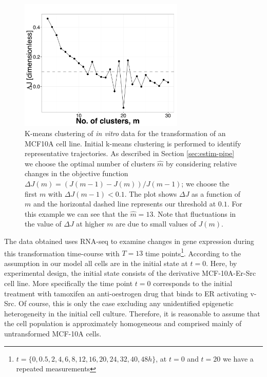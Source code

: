 \begin{figure}
  \centering
  \includegraphics[width=0.7\textwidth]{pics/kmeans-dat.pdf}
  \caption{K-means clustering of {\it in vitro} data for the transformation of an MCF10A cell line. Initial k-means clustering is performed to identify representative trajectories. As described in Section \ref{sec:estim-pipe} we choose the optimal number of clusters $\hat{m}$ by considering relative changes in the objective function $\Delta J (m) = (J(m-1) - J(m))/J(m-1)$; we choose the first $m$ with $\Delta J(m-1) < 0.1$. The plot shows $\Delta J$ as a function of $m$ and the horizontal dashed line represents our threshold at $0.1$. For this example we can see that the $\hat{m} = 13$. Note that fluctuations in the value of $\Delta J$ at higher $m$ are due to small values of $J(m)$. }
  \label{fig:kmeans-dat}
\end{figure}

The data obtained uses RNA-seq to examine changes in gene expression during this transformation time-course with $T=13$ time points\footnote{$t=\lbrace 0, 0.5,  2,  4,  6,  8, 12, 16, 20, 24, 32, 40, 48h \rbrace$, at $t=0$ and $t=20$ we have a repeated measurements}. According to the assumption in our model all cells are in the initial state at $t=0$. Here, by experimental design, the initial state consists of the derivative MCF-10A-Er-Src cell line. More specifically the time point $t=0$ corresponds to the initial treatment with tamoxifen an anti-oestrogen drug that binds to ER activating v-Src. Of course, this is only the case excluding any unidentified epigenetic heterogeneity in the initial cell culture. Therefore, it is reasonable to assume that the cell population is approximately homogeneous and comprised mainly of untransformed MCF-10A cells.

